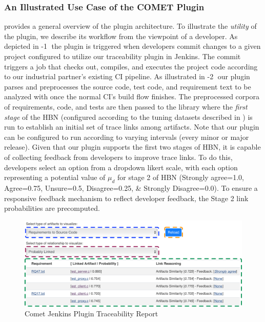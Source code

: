 \subsubsection{\textbf{An Illustrated Use Case of the C{\footnotesize OMET} Plugin}}  provides a general overview of the \Comet plugin architecture. To illustrate the \textit{utility} of the plugin, we describe its workflow from the viewpoint of a developer. As depicted in -\textcircled{1} the plugin is triggered when developers commit changes to a given project configured to utilize our traceability plugin in Jenkins. The commit triggers a job that checks out, compiles, and executes the project code according to our industrial partner's existing CI pipeline. As illustrated in -\textcircled{2} our plugin parses and preprocesses the source code, test code, and requirement text to be analyzed with \Comet once the normal CI's build flow finishes. The preprocessed corpora of requirements, code, and tests are then passed to the \Comet library where the \textit{first stage} of the HBN (configured according to the tuning datasets described in ) is run to establish an initial set of trace links among artifacts.  Note that our plugin can be configured to run according to varying intervals (\eg every minor or major release). Given that our plugin supports the first two stages of \Comets HBN, it is capable of collecting feedback from developers to improve trace links. To do this, developers select an option from a dropdown likert scale, with each option representing a potential value of $\mu_d$ for stage 2 of \Comets HBN (Strongly agree=1.0, Agree=0.75, Unsure=0.5, Disagree=0.25, \& Strongly Disagree=0.0). To ensure a responsive feedback mechanism to reflect developer feedback, the Stage 2 link probabilities are precomputed. 

\begin{figure}[h]
\centering
\includegraphics[width=\columnwidth]{graphics/chap_04-bayes/fig7_comet-ui.pdf}
\caption{Comet Jenkins Plugin Traceability Report}
\label{fig:comet-plugin-ui}
\end{figure}

